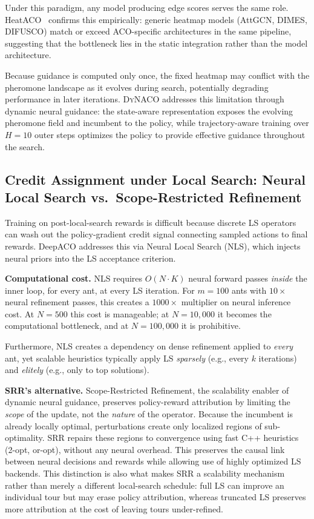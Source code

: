 \documentclass[sigconf,nonacm]{acmart}
\newcommand{\DyNACO}{\textsc{DyNACO}}
\begin{document}
Under this paradigm, any model producing edge scores serves the same role.
HeatACO~\cite{heataco} confirms this empirically: generic heatmap models (AttGCN, DIMES, DIFUSCO) match or exceed ACO-specific architectures in the same pipeline, suggesting that the bottleneck lies in the static integration rather than the model architecture.

Because guidance is computed only once, the fixed heatmap may conflict with the pheromone landscape as it evolves during search, potentially degrading performance in later iterations.
\DyNACO{} addresses this limitation through dynamic neural guidance: the state-aware representation exposes the evolving pheromone field and incumbent to the policy, while trajectory-aware training over $H{=}10$ outer steps optimizes the policy to provide effective guidance throughout the search.

\subsection{Credit Assignment under Local Search: Neural Local Search vs.\ Scope-Restricted Refinement}
\label{app:nls-analysis}

Training on post-local-search rewards is difficult because discrete LS operators can wash out the policy-gradient credit signal connecting sampled actions to final rewards.
DeepACO addresses this via Neural Local Search (NLS), which injects neural priors into the LS acceptance criterion.

\textbf{Computational cost.}
NLS requires $O(N \cdot K)$ neural forward passes \emph{inside} the inner loop, for every ant, at every LS iteration.
For $m{=}100$ ants with $10{\times}$ neural refinement passes, this creates a $1000{\times}$ multiplier on neural inference cost.
At $N{=}500$ this cost is manageable; at $N{=}10{,}000$ it becomes the computational bottleneck, and at $N{=}100{,}000$ it is prohibitive.

Furthermore, NLS creates a dependency on dense refinement applied to \emph{every} ant, yet scalable heuristics typically apply LS \emph{sparsely} (e.g., every $k$ iterations) and \emph{elitely} (e.g., only to top solutions).

\textbf{SRR's alternative.}
Scope-Restricted Refinement, the scalability enabler of dynamic neural guidance, preserves policy-reward attribution by limiting the \emph{scope} of the update, not the \emph{nature} of the operator.
Because the incumbent is already locally optimal, perturbations create only localized regions of sub-optimality.
SRR repairs these regions to convergence using fast C++ heuristics (2-opt, or-opt), without any neural overhead.
This preserves the causal link between neural decisions and rewards while allowing use of highly optimized LS backends.
This distinction is also what makes SRR a scalability mechanism rather than merely a different local-search schedule: full LS can improve an individual tour but may erase policy attribution, whereas truncated LS preserves more attribution at the cost of leaving tours under-refined.
\end{document}
